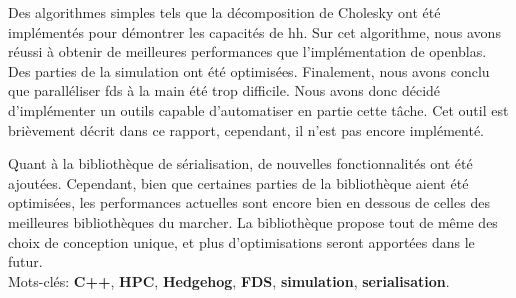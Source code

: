 Des algorithmes simples tels que la décomposition de Cholesky ont été
implémentés pour démontrer les capacités de \gls{hh}. Sur cet algorithme, nous
avons réussi à obtenir de meilleures performances que l'implémentation de
openblas. Des parties de la simulation ont été optimisées. Finalement, nous
avons conclu que paralléliser \gls{fds} à la main été trop difficile. Nous avons
donc décidé d'implémenter un outils capable d'automatiser en partie cette tâche.
Cet outil est brièvement décrit dans ce rapport, cependant, il n'est pas encore
implémenté.

Quant à la bibliothèque de sérialisation, de nouvelles fonctionnalités ont été
ajoutées. Cependant, bien que certaines parties de la bibliothèque aient été
optimisées, les performances actuelles sont encore bien en dessous de celles des
meilleures bibliothèques du marcher. La bibliothèque propose tout de même des
choix de conception unique, et plus d'optimisations seront apportées dans le
futur.\\

Mots-clés: \textbf{C++}, \textbf{HPC}, \textbf{Hedgehog}, \textbf{FDS},
\textbf{simulation}, \textbf{serialisation}.
